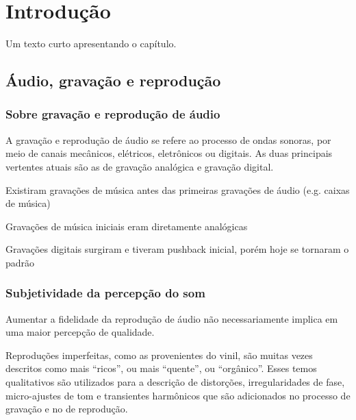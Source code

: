 
\chapter{Introdução}\label{cap:introducao}

Um texto curto apresentando o capítulo.

\section{Áudio, gravação e reprodução}\label{sec:audioGravacaoReproducao}
\subsection{Sobre gravação e reprodução de áudio}\label{subsec:gravacaoReproducaoAudio}

A gravação e reprodução de áudio se refere ao processo de ondas sonoras, por meio de canais mecânicos, elétricos, eletrônicos ou digitais. As duas principais vertentes atuais são as de gravação analógica e gravação digital. 

\color{orange}
Existiram gravações de música antes das primeiras gravações de áudio (e.g. caixas de música)

Gravações de música iniciais eram diretamente analógicas

Gravações digitais surgiram e tiveram pushback inicial, porém hoje se tornaram o padrão

\color{black}


\subsection{Subjetividade da percepção do som}\label{subsec:subjetividadeSom}

Aumentar a fidelidade da reprodução de áudio não necessariamente implica em uma maior percepção de qualidade. 

Reproduções imperfeitas, como as provenientes do vinil, são muitas vezes descritos como mais “ricos”, ou mais “quente”, ou “orgânico”. Esses temos qualitativos são utilizados para a descrição de distorções, irregularidades de fase, micro-ajustes de tom e transientes harmônicos que são adicionados no processo de gravação e no de reprodução. 

